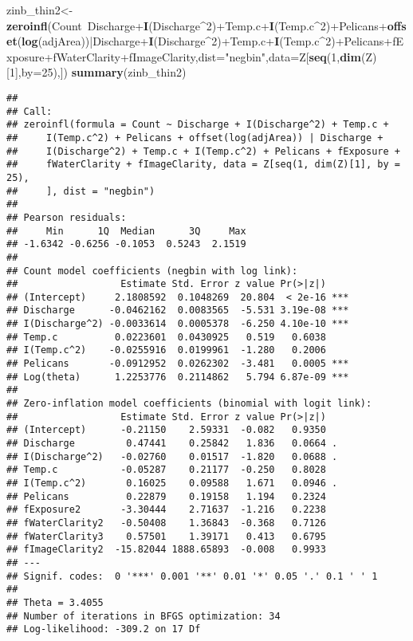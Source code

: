 \documentclass[]{article}
\newenvironment{Shaded}{\begin{snugshade}}{\end{snugshade}}
\newcommand{\KeywordTok}[1]{\textcolor[rgb]{0.13,0.29,0.53}{\textbf{{#1}}}}
\newcommand{\DataTypeTok}[1]{\textcolor[rgb]{0.13,0.29,0.53}{{#1}}}
\newcommand{\DecValTok}[1]{\textcolor[rgb]{0.00,0.00,0.81}{{#1}}}
\newcommand{\StringTok}[1]{\textcolor[rgb]{0.31,0.60,0.02}{{#1}}}
\newcommand{\NormalTok}[1]{{#1}}
\begin{document}
\begin{Shaded}
\begin{Highlighting}[]
\NormalTok{zinb_thin2<-}\KeywordTok{zeroinfl}\NormalTok{(Count~Discharge+}\KeywordTok{I}\NormalTok{(Discharge^}\DecValTok{2}\NormalTok{)+Temp.c+}\KeywordTok{I}\NormalTok{(Temp.c^}\DecValTok{2}\NormalTok{)+Pelicans+}\KeywordTok{offset}\NormalTok{(}\KeywordTok{log}\NormalTok{(adjArea))|Discharge+}\KeywordTok{I}\NormalTok{(Discharge^}\DecValTok{2}\NormalTok{)+Temp.c+}\KeywordTok{I}\NormalTok{(Temp.c^}\DecValTok{2}\NormalTok{)+Pelicans+fExposure+fWaterClarity+fImageClarity,}\DataTypeTok{dist=}\StringTok{"negbin"}\NormalTok{,}\DataTypeTok{data=}\NormalTok{Z[}\KeywordTok{seq}\NormalTok{(}\DecValTok{1}\NormalTok{,}\KeywordTok{dim}\NormalTok{(Z)[}\DecValTok{1}\NormalTok{],}\DataTypeTok{by=}\DecValTok{25}\NormalTok{),])}
\KeywordTok{summary}\NormalTok{(zinb_thin2)}
\end{Highlighting}
\end{Shaded}

\begin{verbatim}
## 
## Call:
## zeroinfl(formula = Count ~ Discharge + I(Discharge^2) + Temp.c + 
##     I(Temp.c^2) + Pelicans + offset(log(adjArea)) | Discharge + 
##     I(Discharge^2) + Temp.c + I(Temp.c^2) + Pelicans + fExposure + 
##     fWaterClarity + fImageClarity, data = Z[seq(1, dim(Z)[1], by = 25), 
##     ], dist = "negbin")
## 
## Pearson residuals:
##     Min      1Q  Median      3Q     Max 
## -1.6342 -0.6256 -0.1053  0.5243  2.1519 
## 
## Count model coefficients (negbin with log link):
##                  Estimate Std. Error z value Pr(>|z|)    
## (Intercept)     2.1808592  0.1048269  20.804  < 2e-16 ***
## Discharge      -0.0462162  0.0083565  -5.531 3.19e-08 ***
## I(Discharge^2) -0.0033614  0.0005378  -6.250 4.10e-10 ***
## Temp.c          0.0223601  0.0430925   0.519   0.6038    
## I(Temp.c^2)    -0.0255916  0.0199961  -1.280   0.2006    
## Pelicans       -0.0912952  0.0262302  -3.481   0.0005 ***
## Log(theta)      1.2253776  0.2114862   5.794 6.87e-09 ***
## 
## Zero-inflation model coefficients (binomial with logit link):
##                  Estimate Std. Error z value Pr(>|z|)  
## (Intercept)      -0.21150    2.59331  -0.082   0.9350  
## Discharge         0.47441    0.25842   1.836   0.0664 .
## I(Discharge^2)   -0.02760    0.01517  -1.820   0.0688 .
## Temp.c           -0.05287    0.21177  -0.250   0.8028  
## I(Temp.c^2)       0.16025    0.09588   1.671   0.0946 .
## Pelicans          0.22879    0.19158   1.194   0.2324  
## fExposure2       -3.30444    2.71637  -1.216   0.2238  
## fWaterClarity2   -0.50408    1.36843  -0.368   0.7126  
## fWaterClarity3    0.57501    1.39171   0.413   0.6795  
## fImageClarity2  -15.82044 1888.65893  -0.008   0.9933  
## ---
## Signif. codes:  0 '***' 0.001 '**' 0.01 '*' 0.05 '.' 0.1 ' ' 1 
## 
## Theta = 3.4055 
## Number of iterations in BFGS optimization: 34 
## Log-likelihood: -309.2 on 17 Df
\end{verbatim}
\end{document}
